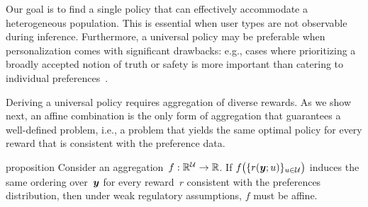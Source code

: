 Our goal is to find a single policy that can effectively accommodate a heterogeneous population.
This is essential when user types are not observable during inference. Furthermore, a universal policy may be preferable when personalization comes with significant drawbacks: e.g., cases where prioritizing a broadly accepted notion of truth or safety is more important than catering to individual preferences~\citep{monteiro2022epistemic,kirk2024benefits}. 

Deriving a universal policy requires aggregation of diverse rewards. As we show next, an affine combination is the only form of aggregation that guarantees a well-defined problem, i.e., a problem that yields the same optimal policy for every reward that is consistent with the preference data.
\begin{theoremEnd}[restate]{proposition}
\label{prop:only_affine}
Consider an aggregation~$f: \mathbb{R}^{\mathcal{U}} \rightarrow \mathbb{R}$. If $f\big(\{r({\bm{y}}; u)\}_{u \in {\mathcal{U}}}\big)$ induces the same ordering over~${\bm{y}}$ for every reward~$r$ consistent with the preferences distribution, then under weak regulatory assumptions, $f$ must be affine. 
\end{theoremEnd}
